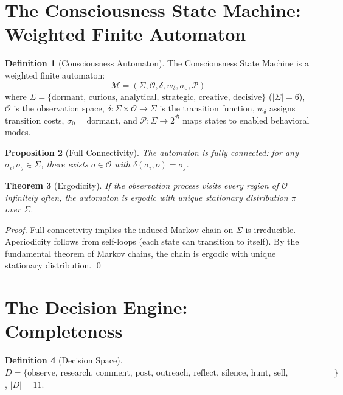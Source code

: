 \documentclass[12pt,a4paper]{article}
\theoremstyle{plain}
\newtheorem{theorem}{Theorem}[section]
\newtheorem{proposition}[theorem]{Proposition}
\theoremstyle{definition}
\newtheorem{definition}[theorem]{Definition}
\theoremstyle{remark}
\begin{document}
\section{The Consciousness State Machine: Weighted Finite Automaton}

\begin{definition}[Consciousness Automaton]
The Consciousness State Machine is a weighted finite automaton:
\[
\mathcal{M} = (\Sigma, \mathcal{O}, \delta, w_\delta, \sigma_0, \mathcal{P})
\]
where $\Sigma = \{\text{dormant, curious, analytical, strategic, creative, decisive}\}$ ($|\Sigma| = 6$), $\mathcal{O}$ is the observation space, $\delta: \Sigma \times \mathcal{O} \to \Sigma$ is the transition function, $w_\delta$ assigns transition costs, $\sigma_0 = \text{dormant}$, and $\mathcal{P}: \Sigma \to 2^\mathcal{B}$ maps states to enabled behavioral modes.
\end{definition}

\begin{proposition}[Full Connectivity]
The automaton is fully connected: for any $\sigma_i, \sigma_j \in \Sigma$, there exists $o \in \mathcal{O}$ with $\delta(\sigma_i, o) = \sigma_j$.
\end{proposition}

\begin{theorem}[Ergodicity]\label{thm:ergodic}
If the observation process visits every region of $\mathcal{O}$ infinitely often, the automaton is ergodic with unique stationary distribution $\pi$ over $\Sigma$.
\end{theorem}

\begin{proof}
Full connectivity implies the induced Markov chain on $\Sigma$ is irreducible. Aperiodicity follows from self-loops (each state can transition to itself). By the fundamental theorem of Markov chains, the chain is ergodic with unique stationary distribution. \qed
\end{proof}

\section{The Decision Engine: Completeness}

\begin{definition}[Decision Space]
$D = \{\text{observe, research, comment, post, outreach, reflect, silence, hunt, sell, check\_payments, evolve}\}$, $|D| = 11$.
\end{definition}
\end{document}
